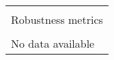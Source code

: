 \begin{tabular}{l}
\toprule\\
Robustness metrics\\
\midrule\\
No data available\\
\bottomrule
\end{tabular}
